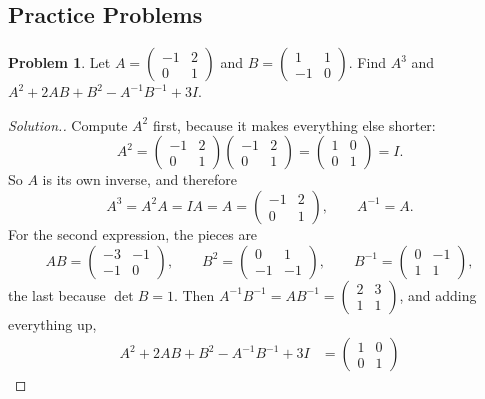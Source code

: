 \documentclass[11pt,a4paper]{article}
\theoremstyle{definition}
\newtheorem{problemx}{Problem}[section]
\newenvironment{problem}{\begin{problemx}}{\end{problemx}}
\newenvironment{solution}
  {\renewcommand{\qedsymbol}{}\begin{proof}[\textit{Solution}.]}
  {\end{proof}}
\begin{document}
\subsection{Practice Problems}

\begin{problem}
Let $A=\begin{pmatrix}-1&2\\0&1\end{pmatrix}$ and
$B=\begin{pmatrix}1&1\\-1&0\end{pmatrix}$. Find $A^3$ and
$A^2+2AB+B^2-A^{-1}B^{-1}+3I$.
\end{problem}
\begin{solution}
Compute $A^2$ first, because it makes everything else shorter:
$$A^2=\begin{pmatrix}-1&2\\0&1\end{pmatrix}
      \begin{pmatrix}-1&2\\0&1\end{pmatrix}
     =\begin{pmatrix}1&0\\0&1\end{pmatrix}=I.$$
So $A$ is its own inverse, and therefore
$$A^3=A^2A=IA=A=\begin{pmatrix}-1&2\\0&1\end{pmatrix},\qquad A^{-1}=A.$$
For the second expression, the pieces are
$$AB=\begin{pmatrix}-3&-1\\-1&0\end{pmatrix},\qquad
B^2=\begin{pmatrix}0&1\\-1&-1\end{pmatrix},\qquad
B^{-1}=\begin{pmatrix}0&-1\\1&1\end{pmatrix},$$
the last because $\det B=1$. Then
$A^{-1}B^{-1}=AB^{-1}=\begin{pmatrix}2&3\\1&1\end{pmatrix}$, and adding
everything up,
\begin{align*}
A^2+2AB+B^2-A^{-1}B^{-1}+3I
&=\begin{pmatrix}1&0\\0&1\end{pmatrix}

\end{align*}
\end{solution}
\end{document}
